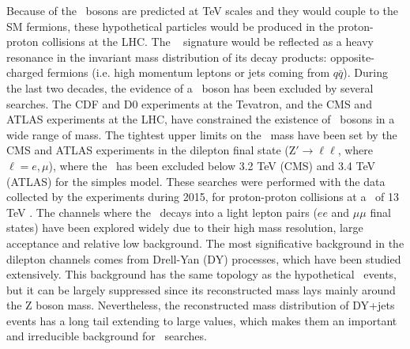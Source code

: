 Because of the \Zprime~bosons are predicted at TeV scales and they would couple to the SM fermions, 
these hypothetical particles would be produced in the proton-proton collisions at the LHC. The \Zprime~ 
signature would be reflected as a heavy resonance in the invariant mass distribution of its 
decay products: opposite-charged fermions (i.e. high momentum leptons or jets coming from $q\bar{q}$). During 
the last two decades, the evidence of a \Zprime~boson has been excluded by several searches. 
The CDF \cite{CDFZprimedielectronbib,CDFZprimedimuonbib,CDFZprimeditaubib,CDFZprimeditopbib}  
and D0 \cite{D0Zprimesearchesbib,D0Zprimetodielectronbib,D0Zprimeditopbib} experiments at the Tevatron, and
the CMS \cite{CMSZprime2dileptonbib,CMSZprime2ditaubib,CMSZprime2tausRunII,CMSZprime2ditauelectronmuonbib,CMSZprime2toptop,CMSZprime2bbbib,CMSZprime2dijetbib}
and ATLAS \cite{ATLASZprime2dileptonbib,ATLASZprime2ditaubib,ATLASZprime2toptopbib, ATLAS_Zprime2tausRunII} experiments at the LHC, have 
constrained the existence of \Zprime~bosons in a wide range of mass. The tightest 
upper limits on the \Zprime~mass have been set by the CMS and ATLAS experiments in the dilepton final 
state (Z$'\rightarrow \ell\ell$, where $\ell=e, \mu$), where the \Zprime~has been excluded below 3.2 TeV (CMS) and 3.4 TeV (ATLAS)
for the simples model. These searches were performed with the data collected by the experiments during 2015, for proton-proton 
collisions at a \centermassenergy~of 13 TeV \cite{CMSZprime2dileptonbib,ATLASZprime2dileptonbib}. The channels
where the \Zprime~decays into a light lepton pairs ($ee$ and $\mu\mu$ final states) have been explored
widely due to their high mass resolution, large acceptance and relative low background. The most significative 
background in the dilepton channels comes from Drell-Yan (DY) processes, which have been studied extensively. This 
background has the same topology as the hypothetical \Zprime~events, but it can be largely 
suppressed since its reconstructed mass lays mainly around the Z boson mass. Nevertheless, the 
reconstructed mass distribution of DY+jets events has a long tail extending to large values, which 
makes them an important and irreducible background for \Zprime~searches.  \\

